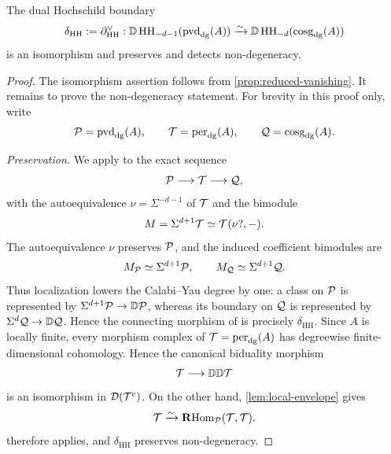 \documentclass[11pt,a4paper,dvipsnames,x11names]{amsart}
\begin{document}
\begin{prop}\label{prop:nondegeneracy}
The dual Hochschild boundary
\[
\delta_{\mathrm{HH}}:=\partial_{\mathrm{HH}}^\vee:
\mathbb D\operatorname{HH}_{-d-1}(\operatorname{pvd}_{\mathrm{dg}}(A))\xrightarrow{\sim}\mathbb D\operatorname{HH}_{-d}(\operatorname{cosg}_{\mathrm{dg}}(A))
\]
is an isomorphism and preserves and detects non-degeneracy.
\end{prop}

\begin{proof}
The isomorphism assertion follows from \cref{prop:reduced-vanishing}. It remains to prove the non-degeneracy statement. For brevity in this proof only, write
\[
\mathcal P=\operatorname{pvd}_{\mathrm{dg}}(A),\qquad \mathcal T=\operatorname{per}_{\mathrm{dg}}(A),\qquad \mathcal Q=\operatorname{cosg}_{\mathrm{dg}}(A).
\]

\emph{Preservation.}
We apply \cite[Theorem~4.3.1]{HaniharaLiu26} to the exact sequence
\[
\mathcal P\longrightarrow\mathcal T\longrightarrow\mathcal Q,
\]
with the autoequivalence $\nu=\Sigma^{-d-1}$ of $\mathcal T$ and the bimodule
\[
M=\Sigma^{d+1}\mathcal T\simeq\mathcal T(\nu ?,-).
\]
The autoequivalence $\nu$ preserves $\mathcal P$, and the induced coefficient bimodules are
\[
M_{\mathcal P}\simeq\Sigma^{d+1}\mathcal P,
\qquad
M_{\mathcal Q}\simeq\Sigma^{d+1}\mathcal Q.
\]
Thus localization lowers the Calabi--Yau degree by one: a class on $\mathcal P$ is represented by $\Sigma^{d+1}\mathcal P\to\mathbb D\mathcal P$, whereas its boundary on $\mathcal Q$ is represented by $\Sigma^d\mathcal Q\to\mathbb D\mathcal Q$. Hence the connecting morphism of \cite[Theorem~4.3.1]{HaniharaLiu26} is precisely $\delta_{\mathrm{HH}}$. Since $A$ is locally finite, every morphism complex of $\mathcal T=\operatorname{per}_{\mathrm{dg}}(A)$ has degreewise finite-dimensional cohomology. Hence the canonical biduality morphism
\[
\mathcal T\longrightarrow\mathbb D\mathbb D\mathcal T
\]
is an isomorphism in $\mathcal D(\mathcal T^e)$. On the other hand, \cref{lem:local-envelope} gives
\[
\mathcal T\xrightarrow{\sim}\operatorname{\mathbf{R}Hom}_{\mathcal P}(\mathcal T,\mathcal T).
\]
\cite[Theorem~4.3.1(b)]{HaniharaLiu26} therefore applies, and $\delta_{\mathrm{HH}}$ preserves non-degeneracy.


\end{proof}
\end{document}
